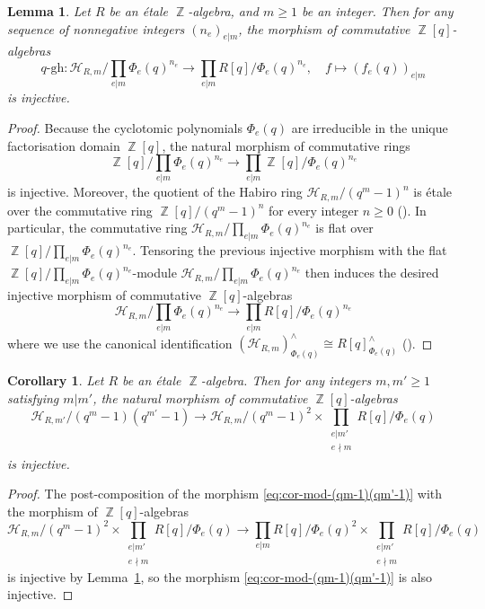 \documentclass[10pt,twoside]{scrarticle}
\newtheorem{lemma}[theorem]{Lemma}
\newtheorem{corollary}[theorem]{Corollary}
\theoremstyle{definition}
\DeclareMathOperator{\Z}{\mathbb{Z}}
\newcommand{\gh}{\mathrm{gh}}
\renewcommand{\ge}{\geqslant}
\numberwithin{equation}{theorem}
\begin{document}
\begin{lemma}\label{lemmaqghostmapinjectiveHabiro}
    Let $R$ be an étale $\Z$-algebra, and $m \ge 1$ be an integer. Then for any sequence of nonnegative integers $(n_e)_{e|m}$, the morphism of commutative $\Z[q]$-algebras
    $$q\text{-}\gh : \mathcal{H}_{R,m}/\prod_{e|m} \Phi_e(q)^{n_e} \longrightarrow \prod_{e|m} R[q]/\Phi_e(q)^{n_e}, \quad f \longmapsto (f_e(q))_{e|m}$$
    is injective.
\end{lemma}

\begin{proof}
    Because the cyclotomic polynomials $\Phi_e(q)$ are irreducible in the unique factorisation domain $\Z[q]$, the natural morphism of commutative rings
    $$\Z[q]/\prod_{e|m} \Phi_e(q)^{n_e} \longrightarrow \prod_{e|m} \Z[q]/\Phi_e(q)^{n_e}$$
    is injective. Moreover, the quotient of the Habiro ring $\mathcal{H}_{R,m}/(q^m-1)^n$ is étale over the commutative ring $\Z[q]/(q^m-1)^n$ for every integer $n \ge 0$ (\cite[Theorem~2.9]{wagner_q-hodge_2025}). In particular, the commutative ring $\mathcal{H}_{R,m}/\prod_{e|m} \Phi_e(q)^{n_e}$ is flat over $\Z[q]/\prod_{e|m} \Phi_e(q)^{n_e}$. Tensoring the previous \hbox{injective} morphism with the flat $\Z[q]/\prod_{e|m} \Phi_e(q)^{n_e}$-module $\mathcal{H}_{R,m}/\prod_{e|m} \Phi_e(q)^{n_e}$ 
    then induces the desired injective morphism of commutative $\Z[q]$-algebras 
    $$\mathcal{H}_{R,m}/\prod_{e|m} \Phi_e(q)^{n_e} \longrightarrow \prod_{e|m} R[q]/\Phi_e(q)^{n_e}$$
    where we use the canonical identification $(\mathcal{H}_{R,m})^\wedge_{\Phi_e(q)} \cong R[q]^\wedge_{\Phi_e(q)}$ (\cite[2.7]{wagner_q-hodge_2025}).
\end{proof}

\begin{corollary}\label{corollaryinjectiveHabiromandm'}
    Let $R$ be an étale $\Z$-algebra. Then for any integers $m,m' \ge 1$ satisfying $m|m'$, the natural morphism of commutative $\Z[q]$-algebras
    \begin{equation}\label{eq:cor-mod-(qm-1)(qm'-1)}\mathcal{H}_{R,m'}/(q^m-1)(q^{m'}-1) \longrightarrow \mathcal{H}_{R,m}/(q^m-1)^2 \times \prod_{\substack{e|m' \\ e \nmid m}} R[q]/\Phi_e(q)
    \end{equation}
    is injective.
\end{corollary}

\begin{proof}
    The post-composition of the morphism \eqref{eq:cor-mod-(qm-1)(qm'-1)} with the morphism of $\Z[q]$-algebras
    $$ \mathcal{H}_{R,m}/(q^m-1)^2 \times \prod_{\substack{e|m' \\ e \nmid m}} R[q]/\Phi_e(q) \longrightarrow \prod_{e|m} R[q]/\Phi_e(q)^2 \times \prod_{\substack{e|m' \\ e \nmid m}} R[q]/\Phi_e(q)$$
    is injective by Lemma~\ref{lemmaqghostmapinjectiveHabiro}, so the morphism \eqref{eq:cor-mod-(qm-1)(qm'-1)} is also injective.
\end{proof}
\end{document}
